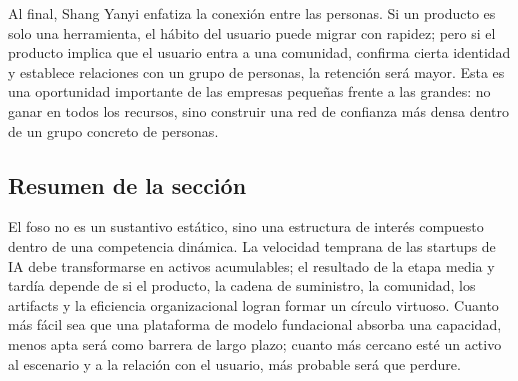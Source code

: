 Al final, Shang Yanyi enfatiza la conexión entre las personas. Si un producto es solo una herramienta, el hábito del usuario puede migrar con rapidez; pero si el producto implica que el usuario entra a una comunidad, confirma cierta identidad y establece relaciones con un grupo de personas, la retención será mayor. Esta es una oportunidad importante de las empresas pequeñas frente a las grandes: no ganar en todos los recursos, sino construir una red de confianza más densa dentro de un grupo concreto de personas.

\subsection{Resumen de la sección}

El foso no es un sustantivo estático, sino una estructura de interés compuesto dentro de una competencia dinámica. La velocidad temprana de las startups de IA debe transformarse en activos acumulables; el resultado de la etapa media y tardía depende de si el producto, la cadena de suministro, la comunidad, los artifacts y la eficiencia organizacional logran formar un círculo virtuoso. Cuanto más fácil sea que una plataforma de modelo fundacional absorba una capacidad, menos apta será como barrera de largo plazo; cuanto más cercano esté un activo al escenario y a la relación con el usuario, más probable será que perdure.
